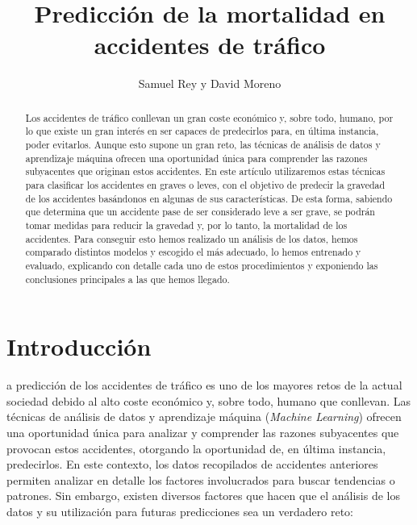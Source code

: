 \documentclass[journal,twoside]{JoPhA}
\begin{document}
\title{Predicción de la mortalidad en accidentes de tráfico}
 
\author{Samuel Rey y David Moreno
}


\maketitle


\begin{abstract}
Los accidentes de tráfico conllevan un gran coste económico y, sobre todo, humano, por lo que existe un gran interés en ser capaces de predecirlos para, en última instancia, poder evitarlos. Aunque esto supone un gran reto, las técnicas de análisis de datos y aprendizaje máquina ofrecen una oportunidad única para comprender las razones subyacentes que originan estos accidentes. En este artículo utilizaremos estas técnicas para clasificar los accidentes en graves o leves, con el objetivo de predecir la gravedad de los accidentes basándonos en algunas de sus características. De esta forma, sabiendo que determina que un accidente pase de ser considerado leve a ser grave, se podrán tomar medidas para reducir la gravedad y, por lo tanto, la mortalidad de los accidentes. Para conseguir esto hemos realizado un análisis de los datos, hemos comparado distintos modelos y escogido el más adecuado, lo hemos entrenado y evaluado, explicando con detalle cada uno de estos procedimientos y exponiendo las conclusiones principales a las que hemos llegado.
\end{abstract}


\section{Introducción}
a predicción de los accidentes de tráfico es uno de los mayores retos de la actual sociedad debido al alto coste económico y, sobre todo, humano que conllevan. Las técnicas de análisis de datos y aprendizaje máquina (\textit{Machine Learning}) ofrecen una oportunidad única para analizar y comprender las razones subyacentes que provocan estos accidentes, otorgando la oportunidad de, en última instancia, predecirlos. En este contexto, los datos recopilados de accidentes anteriores permiten analizar en detalle los factores involucrados para buscar tendencias o patrones. Sin embargo, existen diversos factores que hacen que el análisis de los datos y su utilización para futuras predicciones sea un verdadero reto: \\
	
\end{document}

